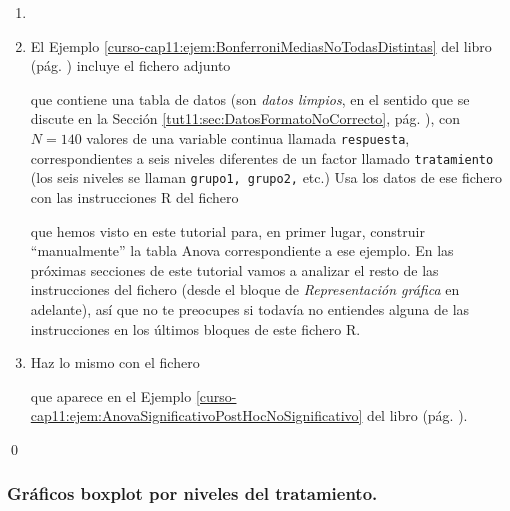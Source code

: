 \documentclass[10pt,a4paper]{article}\usepackage[]{graphicx}\usepackage[]{color}
\newcounter {cont01}
\begin{document}
\begin{ejercicio}
\label{tut11:ejercicio01}
\begin{enumerate}
  \item[]

  \item El Ejemplo \ref{curso-cap11:ejem:BonferroniMediasNoTodasDistintas} del libro (pág. \pageref{curso-cap11:ejem:BonferroniMediasNoTodasDistintas}) incluye el fichero adjunto
  \begin{center}
  \end{center}
  que contiene una tabla de datos (son {\em datos limpios}, en el sentido que se discute en la Sección \ref{tut11:sec:DatosFormatoNoCorrecto}, pág. \pageref{tut11:sec:DatosFormatoNoCorrecto}), con $N=140$ valores de una variable continua llamada {\tt respuesta}, correspondientes a seis niveles diferentes de un factor llamado {\tt tratamiento} (los seis niveles se llaman {\tt grupo1, grupo2,} etc.)
  Usa los datos de ese fichero con las instrucciones R del fichero
  \begin{center}
  \end{center}
  que hemos visto en este tutorial para, en primer lugar, construir ``manualmente'' la tabla Anova correspondiente a ese ejemplo. En las próximas secciones de este tutorial vamos a analizar el resto de las instrucciones del fichero (desde el bloque de {\em Representación gráfica} en adelante), así que no te preocupes si todavía no entiendes alguna de las instrucciones en los últimos bloques de este fichero R.

  \item Haz lo mismo con el fichero
  \begin{center}
  \end{center}
  que aparece en el Ejemplo \ref{curso-cap11:ejem:AnovaSignificativoPostHocNoSignificativo} del libro (pág. \pageref{curso-cap11:ejem:AnovaSignificativoPostHocNoSignificativo}).

\end{enumerate}
\qed
\end{ejercicio}


\subsubsection*{Gráficos boxplot por niveles del tratamiento.}
\label{tut07:subsubsec:GraficosBoxplotPorNiveles}
\end{document}
